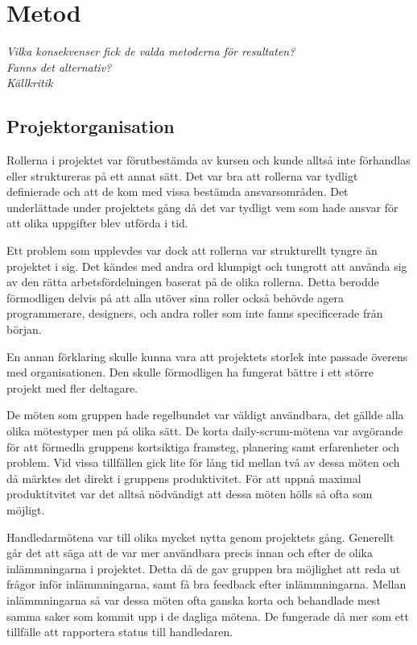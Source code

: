 \section{Metod}
\emph{Vilka konsekvenser fick de valda metoderna för resultaten?} \\
\emph{Fanns det alternativ?}\\
\emph{Källkritik}\\

\subsection{Projektorganisation}
Rollerna i projektet var förutbestämda av kursen och kunde alltså inte förhandlas eller struktureras på ett annat sätt. Det var bra att rollerna var tydligt definierade och att de kom med vissa bestämda ansvarsområden. Det underlättade under projektets gång då det var tydligt vem som hade ansvar för att olika uppgifter blev utförda i tid.

Ett problem som upplevdes var dock att rollerna var strukturellt tyngre än projektet i sig. Det kändes med andra ord klumpigt och tungrott att använda sig av den rätta arbetsfördelningen baserat på de olika rollerna. Detta berodde förmodligen delvis på att alla utöver sina roller också behövde agera programmerare, designers, och andra roller som inte fanns specificerade från början.

En annan förklaring skulle kunna vara att projektets storlek inte passade överens med organisationen. Den skulle förmodligen ha fungerat bättre i ett större projekt med fler deltagare.

De möten som gruppen hade regelbundet var väldigt användbara, det gällde alla olika mötestyper men på olika sätt. De korta daily-scrum-mötena var avgörande för att förmedla gruppens kortsiktiga framsteg, planering samt erfarenheter och problem. Vid vissa tillfällen gick lite för lång tid mellan två av dessa möten och då märktes det direkt i gruppens produktivitet. För att uppnå maximal produktitvitet var det alltså nödvändigt att dessa möten hölls så ofta som möjligt.

Handledarmötena var till olika mycket nytta genom projektets gång. Generellt går det att säga att de var mer användbara precis innan och efter de olika inlämmningarna i projektet. Detta då de gav gruppen bra möjlighet att reda ut frågor inför inlämmningarna, samt få bra feedback efter inlämmningarna.
Mellan inlämmningarna så var dessa möten ofta ganska korta och behandlade mest samma saker som kommit upp i de dagliga mötena. De fungerade då mer som ett tillfälle att rapportera status till handledaren.

